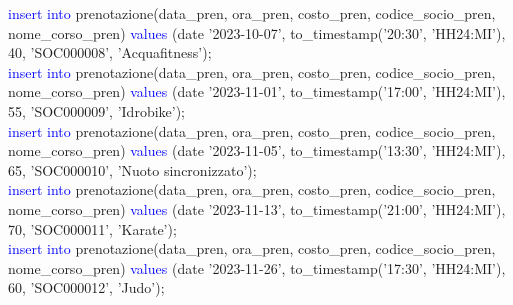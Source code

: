 \documentclass{article}
\begin{document}
\begin{flushleft}
{        \vspace{2mm}
        \hspace*{0.5em}\textcolor{blue}{insert into} prenotazione(data\_pren, ora\_pren, costo\_pren, codice\_socio\_pren, \hspace*{0.5em}nome\_corso\_pren) \textcolor{blue}{values} (date '2023-10-07', to\_timestamp('20:30', 'HH24:MI'), 40, \hspace*{0.5em}'SOC000008', 'Acquafitness'); \\
        \vspace{2mm}
        \hspace*{0.5em}\textcolor{blue}{insert into} prenotazione(data\_pren, ora\_pren, costo\_pren, codice\_socio\_pren, \hspace*{0.5em}nome\_corso\_pren) \textcolor{blue}{values} (date '2023-11-01', to\_timestamp('17:00', 'HH24:MI'), 55, \hspace*{0.5em}'SOC000009', 'Idrobike'); \\
        \vspace{2mm}
        \hspace*{0.5em}\textcolor{blue}{insert into} prenotazione(data\_pren, ora\_pren, costo\_pren, codice\_socio\_pren, \hspace*{0.5em}nome\_corso\_pren) \textcolor{blue}{values} (date '2023-11-05', to\_timestamp('13:30', 'HH24:MI'), 65, \hspace*{0.5em}'SOC000010', 'Nuoto sincronizzato'); \\
        \vspace{2mm}
        \hspace*{0.5em}\textcolor{blue}{insert into} prenotazione(data\_pren, ora\_pren, costo\_pren, codice\_socio\_pren, \hspace*{0.5em}nome\_corso\_pren) \textcolor{blue}{values} (date '2023-11-13', to\_timestamp('21:00', 'HH24:MI'), 70, \hspace*{0.5em}'SOC000011', 'Karate'); \\
        \vspace{2mm}
        \hspace*{0.5em}\textcolor{blue}{insert into} prenotazione(data\_pren, ora\_pren, costo\_pren, codice\_socio\_pren, \hspace*{0.5em}nome\_corso\_pren) \textcolor{blue}{values} (date '2023-11-26', to\_timestamp('17:30', 'HH24:MI'), 60, \hspace*{0.5em}'SOC000012', 'Judo'); \\
        \vspace{2mm}
}
\end{flushleft}
\end{document}
